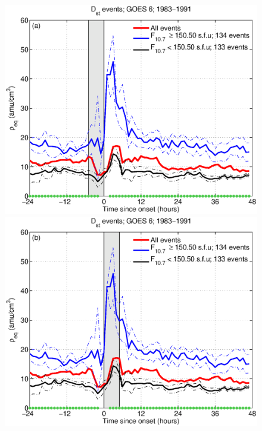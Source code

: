 \begin{figure}[tp!]
  \centering
  \includegraphics[scale=0.40]{2016SW001507R-p06a.eps}
  \includegraphics[scale=0.40]{2016SW001507R-p06b.eps}
\end{figure}
